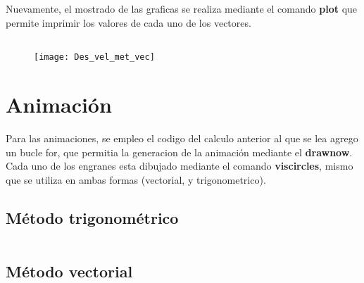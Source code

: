 \documentclass[12pt, final]{extarticle}
\begin{document}
Nuevamente, el mostrado de las graficas se realiza mediante el comando \textbf{plot} que permite imprimir los valores de cada uno de los vectores. 
{\small
\inputminted{matlab}{Codigos/ADA5_metodo_vec.m}}

\begin{figure}[ht]
    \centering
    \texttt{[image: Des\_vel\_met\_vec]}
\end{figure}

\newpage
\section{Animación}

Para las animaciones, se empleo el codigo del calculo anterior al que se lea agrego un bucle for, que permitia la generacion de la animación mediante el \textbf{drawnow}. Cada uno de los engranes esta dibujado mediante el comando \textbf{viscircles}, mismo que se utiliza en ambas formas (vectorial, y trigonometrico). 
\subsection{Método trigonométrico}
{\small
\inputminted{matlab}{Codigos/ADA5_metodo_trig_animacion.m}}

\newpage
\subsection{Método vectorial}

{\small
\inputminted{matlab}{Codigos/ADA5_metodo_vec_animacion.m}}

\nocite{*}
\vfill


\end{document}
